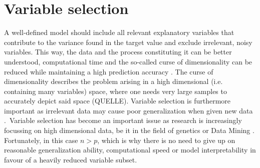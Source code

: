 \documentclass[a4paper, 11pt]{article}
\begin{document}

\section{Variable selection}

A well-defined model should include all relevant explanatory variables that contribute to the variance found in the target value and exclude irrelevant, noisy variables. This way, the data and the process constituting it can be better understood, computational time and the so-called curse of dimensionality can be reduced while maintaining a high prediction accuracy \citep{Chandrashekar.2014}. The curse of dimensionality describes the problem arising in a high dimensional (i.e. containing many variables) space, where one needs very large samples to accurately depict said space (QUELLE). Variable selection is furthermore important as irrelevant data may cause poor generalization when given new data \citep{Chandrashekar.2014, BenIshak.2016}.\
Variable selection has become an important issue as research is increasingly focussing on high dimensional data, be it in the field of genetics or Data Mining \citep{BenIshak.2016}. Fortunately, in this case $n > p$, which is why there is no need to give up on reasonable generalization ability, computational speed or model interpretability in favour of a heavily reduced variable subset.\
\end{document}
